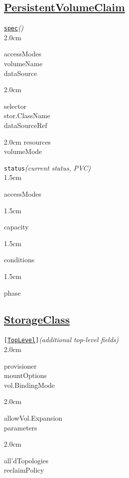 \subsection*{\href{https://kubernetes.io/docs/concepts/storage/persistent-volumes/}{PersistentVolumeClaim}}



\texttt{\href{https://kubernetes.io/docs/reference/kubernetes-api/config-and-storage-resources/persistent-volume-claim-v1/}{spec}}\quad\textit{()}\\[-2mm]
\api
{2.0cm}{
accessModes     \\
volumeName      \\
dataSource

}
{2.0cm}{
selector        \\
stor.ClassName  \\
dataSourceRef

}
{2.0cm}{
resources       \\
volumeMode      \\


}
\stopapi


\texttt{status}\quad\textit{(current status, PVC)}\\[-2mm]
\api
{1.5cm}{
accessModes     

}
{1.5cm}{
capacity        

}
{1.5cm}{
conditions      

}
{1.5cm}{
phase

}
\stopapi


\subsection*{\href{https://kubernetes.io/docs/concepts/storage/storage-classes/}{StorageClass}}



\texttt{[\href{https://kubernetes.io/docs/reference/kubernetes-api/config-and-storage-resources/storage-class-v1/}{TopLevel}]}\quad\textit{(additional top-level fields)}\\[-2mm]
\api
{2.0cm}{
provisioner     \\
mountOptions    \\
vol.BindingMode

}
{2.0cm}{
allowVol.Expansion\\
parameters      

}
{2.0cm}{
all'dTopologies \\
reclaimPolicy

}
\stopapi



